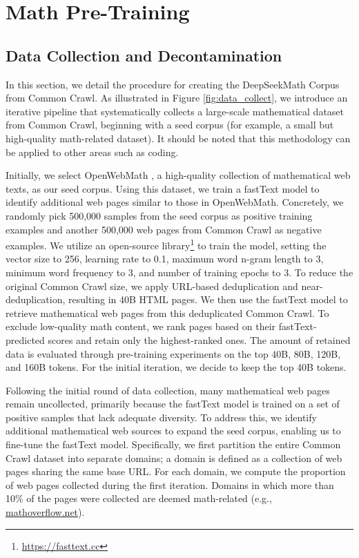 \section{Math Pre-Training}

\subsection{Data Collection and Decontamination} In this section, we detail the procedure for creating the DeepSeekMath Corpus from Common Crawl. As illustrated in Figure \ref{fig:data_collect}, we introduce an iterative pipeline that systematically collects a large-scale mathematical dataset from Common Crawl, beginning with a seed corpus (for example, a small but high-quality math-related dataset). It should be noted that this methodology can be applied to other areas such as coding.

Initially, we select OpenWebMath \citep{openwebmath}, a high-quality collection of mathematical web texts, as our seed corpus. Using this dataset, we train a fastText model \citep{joulin2016fasttext} to identify additional web pages similar to those in OpenWebMath. Concretely, we randomly pick 500,000 samples from the seed corpus as positive training examples and another 500,000 web pages from Common Crawl as negative examples. We utilize an open-source library\footnote{\url{https://fasttext.cc}} to train the model, setting the vector size to 256, learning rate to 0.1, maximum word n-gram length to 3, minimum word frequency to 3, and number of training epochs to 3. To reduce the original Common Crawl size, we apply URL-based deduplication and near-deduplication, resulting in 40B HTML pages. We then use the fastText model to retrieve mathematical web pages from this deduplicated Common Crawl. To exclude low-quality math content, we rank pages based on their fastText-predicted scores and retain only the highest-ranked ones. The amount of retained data is evaluated through pre-training experiments on the top 40B, 80B, 120B, and 160B tokens. For the initial iteration, we decide to keep the top 40B tokens.

Following the initial round of data collection, many mathematical web pages remain uncollected, primarily because the fastText model is trained on a set of positive samples that lack adequate diversity. To address this, we identify additional mathematical web sources to expand the seed corpus, enabling us to fine-tune the fastText model. Specifically, we first partition the entire Common Crawl dataset into separate domains; a domain is defined as a collection of web pages sharing the same base URL. For each domain, we compute the proportion of web pages collected during the first iteration. Domains in which more than 10\% of the pages were collected are deemed math-related (e.g., \url{mathoverflow.net}).

